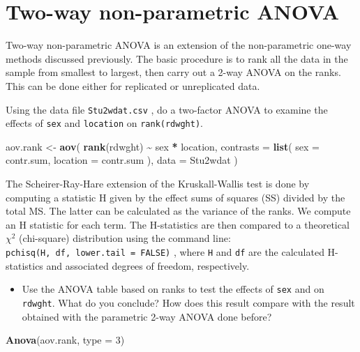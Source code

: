 \documentclass[
  12pt,
]{book}
\newenvironment{Shaded}{\begin{snugshade}}{\end{snugshade}}
\newcommand{\DataTypeTok}[1]{\textcolor[rgb]{0.13,0.29,0.53}{#1}}
\newcommand{\DecValTok}[1]{\textcolor[rgb]{0.00,0.00,0.81}{#1}}
\newcommand{\KeywordTok}[1]{\textcolor[rgb]{0.13,0.29,0.53}{\textbf{#1}}}
\newcommand{\NormalTok}[1]{#1}
\newcommand{\OperatorTok}[1]{\textcolor[rgb]{0.81,0.36,0.00}{\textbf{#1}}}
\newcommand{\StringTok}[1]{\textcolor[rgb]{0.31,0.60,0.02}{#1}}
\providecommand{\tightlist}{%
  \setlength{\itemsep}{0pt}\setlength{\parskip}{0pt}}
\begin{document}
\hypertarget{two-way-non-parametric-anova}{%
\section{Two-way non-parametric ANOVA}\label{two-way-non-parametric-anova}}

Two-way non-parametric ANOVA is an extension of the non-parametric one-way methods discussed previously. The basic procedure is to rank all the data in the sample from smallest to largest, then carry out a 2-way ANOVA on the ranks. This can be done either for replicated or unreplicated data.

Using the data file \texttt{Stu2wdat.csv} , do a two-factor ANOVA to examine the effects of \texttt{sex} and \texttt{location} on \texttt{rank(rdwght)}.

\begin{Shaded}
\begin{Highlighting}[]
\NormalTok{aov.rank \textless{}{-}}\StringTok{ }\KeywordTok{aov}\NormalTok{(}
  \KeywordTok{rank}\NormalTok{(rdwght) }\OperatorTok{\textasciitilde{}}\StringTok{ }\NormalTok{sex }\OperatorTok{*}\StringTok{ }\NormalTok{location,}
  \DataTypeTok{contrasts =} \KeywordTok{list}\NormalTok{(}
    \DataTypeTok{sex =}\NormalTok{ contr.sum, }\DataTypeTok{location =}\NormalTok{ contr.sum}
\NormalTok{  ),}
  \DataTypeTok{data =}\NormalTok{ Stu2wdat}
\NormalTok{)}
\end{Highlighting}
\end{Shaded}

The Scheirer-Ray-Hare extension of the Kruskall-Wallis test is done by computing a statistic H given by the effect sums of squares (SS) divided by the total MS. The latter can be calculated as the variance of the ranks. We compute an H statistic for each term. The H-statistics are then compared to a theoretical \(\chi^2\) (chi-square) distribution using the command line: \texttt{pchisq(H,\ df,\ lower.tail\ =\ FALSE)} , where \texttt{H} and \texttt{df} are the calculated H-statistics and associated degrees of freedom, respectively.

\begin{itemize}
\tightlist
\item
  Use the ANOVA table based on ranks to test the effects of \texttt{sex} and on \texttt{rdwght}. What do you conclude? How does this result compare with the result obtained with the parametric 2-way ANOVA done before?
\end{itemize}

\begin{Shaded}
\begin{Highlighting}[]
\KeywordTok{Anova}\NormalTok{(aov.rank, }\DataTypeTok{type =} \DecValTok{3}\NormalTok{)}
\end{Highlighting}
\end{Shaded}
\end{document}
